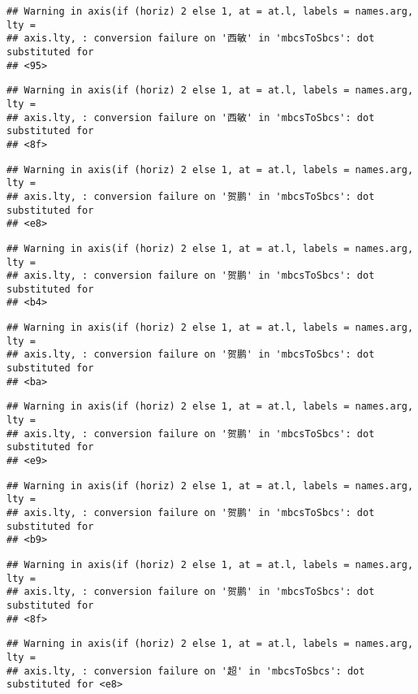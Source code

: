 \documentclass[
]{article}
\begin{document}
\begin{verbatim}
## Warning in axis(if (horiz) 2 else 1, at = at.l, labels = names.arg, lty =
## axis.lty, : conversion failure on '西敏' in 'mbcsToSbcs': dot substituted for
## <95>
\end{verbatim}

\begin{verbatim}
## Warning in axis(if (horiz) 2 else 1, at = at.l, labels = names.arg, lty =
## axis.lty, : conversion failure on '西敏' in 'mbcsToSbcs': dot substituted for
## <8f>
\end{verbatim}

\begin{verbatim}
## Warning in axis(if (horiz) 2 else 1, at = at.l, labels = names.arg, lty =
## axis.lty, : conversion failure on '贺鹏' in 'mbcsToSbcs': dot substituted for
## <e8>
\end{verbatim}

\begin{verbatim}
## Warning in axis(if (horiz) 2 else 1, at = at.l, labels = names.arg, lty =
## axis.lty, : conversion failure on '贺鹏' in 'mbcsToSbcs': dot substituted for
## <b4>
\end{verbatim}

\begin{verbatim}
## Warning in axis(if (horiz) 2 else 1, at = at.l, labels = names.arg, lty =
## axis.lty, : conversion failure on '贺鹏' in 'mbcsToSbcs': dot substituted for
## <ba>
\end{verbatim}

\begin{verbatim}
## Warning in axis(if (horiz) 2 else 1, at = at.l, labels = names.arg, lty =
## axis.lty, : conversion failure on '贺鹏' in 'mbcsToSbcs': dot substituted for
## <e9>
\end{verbatim}

\begin{verbatim}
## Warning in axis(if (horiz) 2 else 1, at = at.l, labels = names.arg, lty =
## axis.lty, : conversion failure on '贺鹏' in 'mbcsToSbcs': dot substituted for
## <b9>
\end{verbatim}

\begin{verbatim}
## Warning in axis(if (horiz) 2 else 1, at = at.l, labels = names.arg, lty =
## axis.lty, : conversion failure on '贺鹏' in 'mbcsToSbcs': dot substituted for
## <8f>
\end{verbatim}

\begin{verbatim}
## Warning in axis(if (horiz) 2 else 1, at = at.l, labels = names.arg, lty =
## axis.lty, : conversion failure on '超' in 'mbcsToSbcs': dot substituted for <e8>
\end{verbatim}
\end{document}
